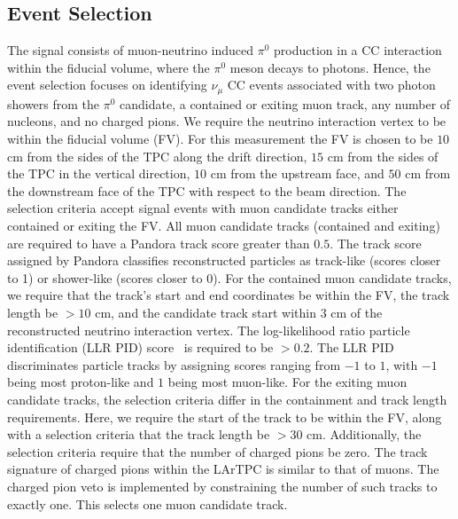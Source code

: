 \documentclass[%
 reprint,
 amsmath,amssymb, longbibliography,
 aps, 
 prd,
 twocolumn,
 showpacs,
 superscriptaddress
]{revtex4-2}
\begin{document}
\subsection{Event Selection \label{evt_sel}}
The signal consists of muon-neutrino induced $\pi^0$ production in a CC interaction within the fiducial volume, where the $\pi^0$ meson decays to photons. Hence, the event selection focuses on identifying $\nu_{\mu}$ CC events associated with two photon showers from the $\pi^0$ candidate, a contained or exiting muon track, any number of nucleons, and no charged pions. We require the neutrino interaction vertex to be within the fiducial volume (FV). For this measurement the FV is chosen to be $10$ cm from the sides of the TPC along the drift direction, $15$ cm from the sides of the TPC in the vertical direction, $10$ cm from the upstream face, and $50$ cm from the downstream face of the TPC with respect to the beam direction. The selection criteria accept signal events with muon candidate tracks either contained or exiting the FV. All muon candidate tracks (contained and exiting) are required to have a Pandora track score greater than $0.5$. The track score assigned by Pandora classifies reconstructed particles as track-like (scores closer to 1) or shower-like (scores closer to 0). For the contained muon candidate tracks, we require that the track's start and end coordinates be within the FV, the track length be $> 10$ cm, and the candidate track start within $3$ cm of the reconstructed neutrino interaction vertex. The log-likelihood ratio particle identification (LLR PID) score~\cite{JHEP} is required to be $> 0.2$. The LLR PID discriminates particle tracks by assigning scores ranging from $-1$ to $1$, with $-1$ being most proton-like and $1$ being most muon-like. For the exiting muon candidate tracks, the selection criteria differ in the containment and track length requirements. Here, we require the start of the track to be within the FV, along with a selection criteria that the track length be $> 30$ cm. Additionally, the selection criteria require that the number of charged pions be zero. The track signature of charged pions within the LArTPC is similar to that of muons. The charged pion veto is implemented by constraining the number of such tracks to exactly one. This selects one muon candidate track. 
\end{document}
